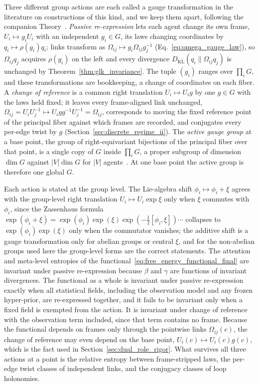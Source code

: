 Three different group actions are each called a gauge transformation in the literature on constructions of this kind, and we keep them apart, following the companion Theory~\cite[Ch.~2]{DennisGaugeVFE2026}. \emph{Passive re-expression} lets each agent change its own frame, $U_i \mapsto g_iU_i$ with an independent $g_i \in G$, its laws changing coordinates by $q_i \mapsto \rho(g_i)q_i$; links transform as $\Omega_{ij} \mapsto g_i\Omega_{ij}g_j^{-1}$ (Eq.~\eqref{eq:omega_gauge_law}), so $\Omega_{ij}q_j$ acquires $\rho(g_i)$ on the left and every divergence $D_{\mathrm{KL}}(q_i \| \Omega_{ij}q_j)$ is unchanged by Theorem~\ref{thm:glk_invariance}. The tuple $(g_i)$ ranges over $\prod_i G$, and these transformations are bookkeeping, a change of coordinates on each fiber. A \emph{change of reference} is a common right translation $U_i \mapsto U_ig$ by one $g \in G$ with the laws held fixed; it leaves every frame-aligned link unchanged, $\Omega_{ij} = U_iU_j^{-1} \mapsto U_igg^{-1}U_j^{-1} = \Omega_{ij}$, corresponds to moving the fixed reference point of the principal fiber against which frames are recorded, and conjugates every per-edge twist by $g$ (Section~\ref{sec:discrete_regime_ii}). The \emph{active gauge group} at a base point, the group of right-equivariant bijections of the principal fiber over that point, is a single copy of $G$ inside $\prod_i G$, a proper subgroup of dimension $\dim G$ against $|V|\dim G$ for $|V|$ agents~\cite[Ch.~2]{DennisGaugeVFE2026}. At one base point the active group is therefore one global $G$.

Each action is stated at the group level. The Lie-algebra shift $\phi_i \mapsto \phi_i + \xi$ agrees with the group-level right translation $U_i \mapsto U_i\exp\xi$ only when $\xi$ commutes with $\phi_i$, since the Zassenhaus formula $\exp(\phi_i + \xi) = \exp(\phi_i)\exp(\xi)\exp(-\tfrac12 [\phi_i, \xi])\cdots$ collapses to $\exp(\phi_i)\exp(\xi)$ only when the commutator vanishes; the additive shift is a gauge transformation only for abelian groups or central $\xi$, and for the non-abelian groups used here the group-level forms are the correct statements. The attention and meta-level entropies of the functional~\eqref{eq:free_energy_functional_final} are invariant under passive re-expression because $\beta$ and $\gamma$ are functions of invariant divergences. The functional as a whole is invariant under passive re-expression exactly when all statistical fields, including the observation model and any frozen hyper-prior, are re-expressed together, and it fails to be invariant only when a fixed field is exempted from the action. It is invariant under change of reference with the observation term included, since that term contains no frame. Because the functional depends on frames only through the pointwise links $\Omega_{ij}(c)$, the change of reference may even depend on the base point, $U_i(c) \mapsto U_i(c)g(c)$, which is the fact used in Section~\ref{sec:dual_role_rigor}. What survives all three actions at a point is the relative entropy between frame-stripped laws, the per-edge twist classes of independent links, and the conjugacy classes of loop holonomies.

